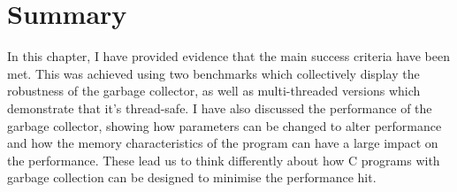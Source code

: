 \documentclass[../diss.tex]{subfiles}
\begin{document}
\section{Summary}

In this chapter, I have provided evidence that the main success criteria have been met. This was achieved using two benchmarks which collectively display the robustness of the garbage collector, as well as multi-threaded versions which demonstrate that it's thread-safe. I have also discussed the performance of the garbage collector, showing how parameters can be changed to alter performance and how the memory characteristics of the program can have a large impact on the performance. These lead us to think differently about how C programs with garbage collection can be designed to minimise the performance hit.
\end{document}
